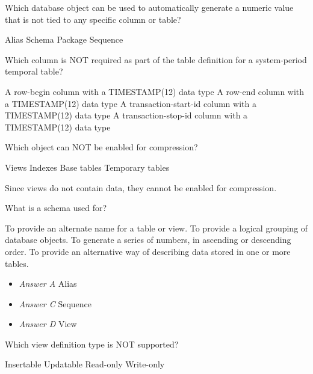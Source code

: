 \documentclass[answers, 11pt]{exam}
\begin{document}
\begin{questions}
\question[1]
Which database object can be used to automatically generate a numeric value that is not tied to any
specific column or table?
\begin{choices}
	\choice Alias
	\choice Schema
	\choice Package
	\CorrectChoice Sequence
\end{choices}

\newpage
\question[1]
Which column is NOT required as part of the table definition for a system-period temporal table?
\begin{choices}
	\choice A row-begin column with a TIMESTAMP(12) data type
	\choice A row-end column with a TIMESTAMP(12) data type
	\choice A transaction-start-id column with a TIMESTAMP(12) data type
	\CorrectChoice A transaction-stop-id column with a TIMESTAMP(12) data type
\end{choices}

\question[1]
Which object can NOT be enabled for compression?
\begin{choices}
	\CorrectChoice Views
	\choice Indexes
	\choice Base tables
	\choice Temporary tables
\end{choices}

\begin{solution}
	Since views do not contain data, they cannot be enabled for compression.
\end{solution}

\question[1]
What is a schema used for?
\begin{choices}
	\choice To provide an alternate name for a table or view.
	\CorrectChoice To provide a logical grouping of database objects.
	\choice To generate a series of numbers, in ascending or descending order.
	\choice To provide an alternative way of describing data stored in one or more tables.
\end{choices}

\begin{solution}
	\begin{itemize}
		\item \textit{Answer A} Alias
		\item \textit{Answer C} Sequence
		\item \textit{Answer D} View
	\end{itemize}
\end{solution}

\question[1]
Which view definition type is NOT supported?
\begin{choices}
	\choice Insertable
	\choice Updatable
	\choice Read-only
	\CorrectChoice Write-only
\end{choices}


\end{questions}
\end{document}
